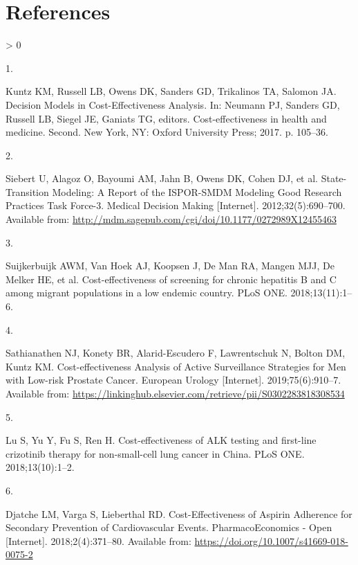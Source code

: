 \documentclass[
]{article}
\newlength{\cslhangindent}
\newlength{\csllabelwidth}
\newenvironment{CSLReferences}[2] %
 {%
  \setlength{\parindent}{0pt}
  \ifodd #1 \everypar{\setlength{\hangindent}{\cslhangindent}}\ignorespaces\fi
  \ifnum #2 > 0
  \setlength{\parskip}{#2\baselineskip}
  \fi
 }%
 {}
\newcommand{\CSLLeftMargin}[1]{\parbox[t]{\csllabelwidth}{#1}}
\newcommand{\CSLRightInline}[1]{\parbox[t]{\linewidth - \csllabelwidth}{#1}\break}
\begin{document}
\hypertarget{references}{%
\section*{References}\label{references}}

\hypertarget{refs}{}
\begin{CSLReferences}{0}{0}
\leavevmode\hypertarget{ref-Kuntz2017}{}%
\CSLLeftMargin{1. }
\CSLRightInline{Kuntz KM, Russell LB, Owens DK, Sanders GD, Trikalinos TA, Salomon JA. {Decision Models in Cost-Effectiveness Analysis}. In: Neumann PJ, Sanders GD, Russell LB, Siegel JE, Ganiats TG, editors. Cost-effectiveness in health and medicine. Second. New York, NY: Oxford University Press; 2017. p. 105--36. }

\leavevmode\hypertarget{ref-Siebert2012c}{}%
\CSLLeftMargin{2. }
\CSLRightInline{Siebert U, Alagoz O, Bayoumi AM, Jahn B, Owens DK, Cohen DJ, et al. {State-Transition Modeling: A Report of the ISPOR-SMDM Modeling Good Research Practices Task Force-3}. Medical Decision Making {[}Internet{]}. 2012;32(5):690--700. Available from: \url{http://mdm.sagepub.com/cgi/doi/10.1177/0272989X12455463}}

\leavevmode\hypertarget{ref-Suijkerbuijk2018}{}%
\CSLLeftMargin{3. }
\CSLRightInline{Suijkerbuijk AWM, Van Hoek AJ, Koopsen J, De Man RA, Mangen MJJ, De Melker HE, et al. {Cost-effectiveness of screening for chronic hepatitis B and C among migrant populations in a low endemic country}. PLoS ONE. 2018;13(11):1--6. }

\leavevmode\hypertarget{ref-Sathianathen2018a}{}%
\CSLLeftMargin{4. }
\CSLRightInline{Sathianathen NJ, Konety BR, Alarid-Escudero F, Lawrentschuk N, Bolton DM, Kuntz KM. {Cost-effectiveness Analysis of Active Surveillance Strategies for Men with Low-risk Prostate Cancer}. European Urology {[}Internet{]}. 2019;75(6):910--7. Available from: \url{https://linkinghub.elsevier.com/retrieve/pii/S0302283818308534}}

\leavevmode\hypertarget{ref-Lu2018b}{}%
\CSLLeftMargin{5. }
\CSLRightInline{Lu S, Yu Y, Fu S, Ren H. {Cost-effectiveness of ALK testing and first-line crizotinib therapy for non-small-cell lung cancer in China}. PLoS ONE. 2018;13(10):1--2. }

\leavevmode\hypertarget{ref-Djatche2018}{}%
\CSLLeftMargin{6. }
\CSLRightInline{Djatche LM, Varga S, Lieberthal RD. {Cost-Effectiveness of Aspirin Adherence for Secondary Prevention of Cardiovascular Events}. PharmacoEconomics - Open {[}Internet{]}. 2018;2(4):371--80. Available from: \url{https://doi.org/10.1007/s41669-018-0075-2}}


\end{CSLReferences}
\end{document}
